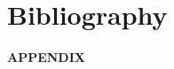 \documentclass[12pt,a4paper,oneside]{article}
\begin{document}
\newpage
\section{Bibliography}
\nocite{*}

\renewcommand{\refname}{}



\newpage
\thispagestyle{empty}
{\Huge \bf \noindent APPENDIX}
\newpage
\end{document}
